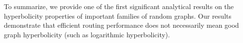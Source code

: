 \documentclass[11pt]{article}
\begin{document}
To summarize, 
	we provide one of the first significant analytical 
	results on the hyperbolicity properties of important families of random graphs.
Our results demonstrate that efficient routing performance does not
	necessarily mean good graph hyperbolicity (such as logarithmic hyperbolicity).









\end{document}
